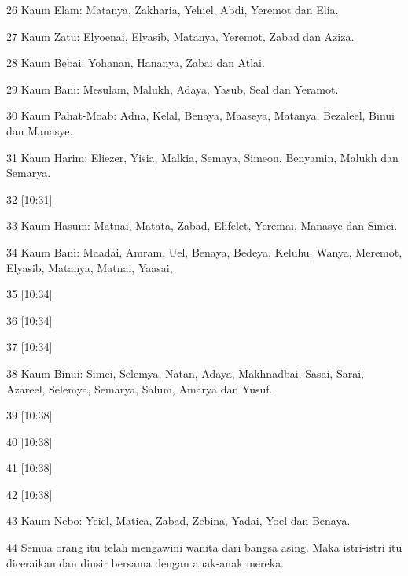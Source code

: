 \par 26 Kaum Elam: Matanya, Zakharia, Yehiel, Abdi, Yeremot dan Elia.
\par 27 Kaum Zatu: Elyoenai, Elyasib, Matanya, Yeremot, Zabad dan Aziza.
\par 28 Kaum Bebai: Yohanan, Hananya, Zabai dan Atlai.
\par 29 Kaum Bani: Mesulam, Malukh, Adaya, Yasub, Seal dan Yeramot.
\par 30 Kaum Pahat-Moab: Adna, Kelal, Benaya, Maaseya, Matanya, Bezaleel, Binui dan Manasye.
\par 31 Kaum Harim: Eliezer, Yisia, Malkia, Semaya, Simeon, Benyamin, Malukh dan Semarya.
\par 32 [10:31]
\par 33 Kaum Hasum: Matnai, Matata, Zabad, Elifelet, Yeremai, Manasye dan Simei.
\par 34 Kaum Bani: Maadai, Amram, Uel, Benaya, Bedeya, Keluhu, Wanya, Meremot, Elyasib, Matanya, Matnai, Yaasai,
\par 35 [10:34]
\par 36 [10:34]
\par 37 [10:34]
\par 38 Kaum Binui: Simei, Selemya, Natan, Adaya, Makhnadbai, Sasai, Sarai, Azareel, Selemya, Semarya, Salum, Amarya dan Yusuf.
\par 39 [10:38]
\par 40 [10:38]
\par 41 [10:38]
\par 42 [10:38]
\par 43 Kaum Nebo: Yeiel, Matica, Zabad, Zebina, Yadai, Yoel dan Benaya.
\par 44 Semua orang itu telah mengawini wanita dari bangsa asing. Maka istri-istri itu diceraikan dan diusir bersama dengan anak-anak mereka.


